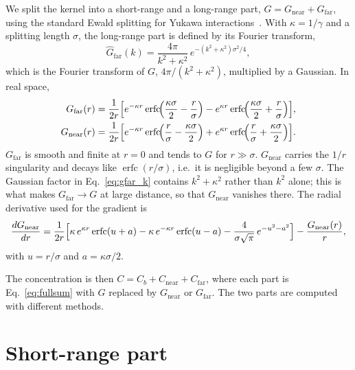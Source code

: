 \documentclass[11pt,a4paper]{article}
\newcommand{\erfc}{\operatorname{erfc}}
\begin{document}
We split the kernel into a short-range and a long-range part,
$G = G_{\mathrm{near}} + G_{\mathrm{far}}$, using the standard Ewald splitting for Yukawa
interactions~\cite{Ewald1921,SalinCaillol2000}. With $\kappa = 1/\gamma$ and a splitting length
$\sigma$, the long-range part is defined by its Fourier transform,
\begin{equation}
  \hat G_{\mathrm{far}}(k) = \frac{4\pi}{k^2+\kappa^2}\,e^{-(k^2+\kappa^2)\sigma^2/4},
  \label{eq:gfar_k}
\end{equation}
which is the Fourier transform of $G$, $4\pi/(k^2+\kappa^2)$, multiplied by a Gaussian. In real
space,
\begin{align}
  G_{\mathrm{far}}(r) &= \frac{1}{2r}\Bigl[e^{-\kappa r}\erfc\!\Bigl(\frac{\kappa\sigma}{2} - \frac{r}{\sigma}\Bigr)
    - e^{\kappa r}\erfc\!\Bigl(\frac{\kappa\sigma}{2} + \frac{r}{\sigma}\Bigr)\Bigr], \\
  G_{\mathrm{near}}(r) &= \frac{1}{2r}\Bigl[e^{-\kappa r}\erfc\!\Bigl(\frac{r}{\sigma} - \frac{\kappa\sigma}{2}\Bigr)
    + e^{\kappa r}\erfc\!\Bigl(\frac{r}{\sigma} + \frac{\kappa\sigma}{2}\Bigr)\Bigr].
  \label{eq:gnear}
\end{align}
$G_{\mathrm{far}}$ is smooth and finite at $r=0$ and tends to $G$ for $r \gg \sigma$.
$G_{\mathrm{near}}$ carries the $1/r$ singularity and decays like $\erfc(r/\sigma)$, i.e.\ it is
negligible beyond a few $\sigma$. The Gaussian factor in Eq.~\eqref{eq:gfar_k} contains
$k^2+\kappa^2$ rather than $k^2$ alone; this is what makes $G_{\mathrm{far}} \to G$ at large
distance, so that $G_{\mathrm{near}}$ vanishes there. The radial derivative used for the gradient is
\begin{equation}
  \frac{dG_{\mathrm{near}}}{dr} = \frac{1}{2r}\Bigl[\kappa\,e^{\kappa r}\erfc(u+a) - \kappa\,e^{-\kappa r}\erfc(u-a)
    - \frac{4}{\sigma\sqrt{\pi}}\,e^{-u^2-a^2}\Bigr] - \frac{G_{\mathrm{near}}(r)}{r},
\end{equation}
with $u = r/\sigma$ and $a = \kappa\sigma/2$.

The concentration is then $C = C_b + C_{\mathrm{near}} + C_{\mathrm{far}}$, where each part is
Eq.~\eqref{eq:fullsum} with $G$ replaced by $G_{\mathrm{near}}$ or $G_{\mathrm{far}}$.
The two parts are computed with different methods.

\section{Short-range part}
\end{document}
